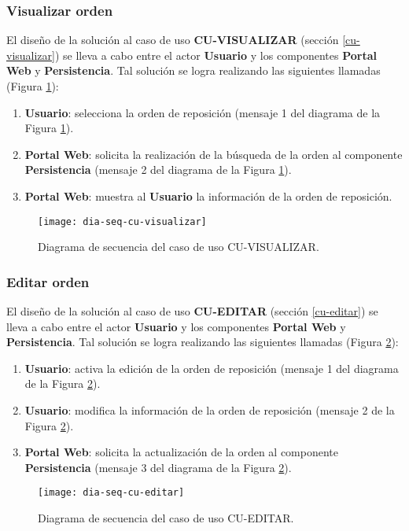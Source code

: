 \subsubsection{Visualizar orden}
El diseño de la solución al caso de uso \textbf{CU-VISUALIZAR} (sección \ref{cu-visualizar}) se lleva a cabo entre el actor \textbf{Usuario} y los componentes \textbf{Portal Web} y \textbf{Persistencia}. Tal solución se logra realizando las siguientes llamadas (Figura \ref{fig:dia-seq-cu-visualizar}):
\begin{enumerate}
	\item \textbf{Usuario}: selecciona la orden de reposición (mensaje 1 del diagrama de la Figura \ref{fig:dia-seq-cu-visualizar}).
	\item \textbf{Portal Web}: solicita la realización de la búsqueda de la orden al componente \textbf{Persistencia} (mensaje 2 del diagrama de la Figura \ref{fig:dia-seq-cu-visualizar}).
	\item \textbf{Portal Web}: muestra al \textbf{Usuario} la información de la orden de reposición.
\end{enumerate}
\begin{figure}[h]
	\centering
	\texttt{[image: dia-seq-cu-visualizar]}
	\caption{Diagrama de secuencia del caso de uso CU-VISUALIZAR.}
	\label{fig:dia-seq-cu-visualizar}
\end{figure}
\subsubsection{Editar orden}
El diseño de la solución al caso de uso \textbf{CU-EDITAR} (sección \ref{cu-editar}) se lleva a cabo entre el actor \textbf{Usuario} y los componentes \textbf{Portal Web} y \textbf{Persistencia}. Tal solución se logra realizando las siguientes llamadas (Figura \ref{fig:dia-seq-cu-editar}):
\begin{enumerate}
	\item \textbf{Usuario}: activa la edición de la orden de reposición (mensaje 1 del diagrama de la Figura \ref{fig:dia-seq-cu-editar}).
	\item \textbf{Usuario}: modifica la información de la orden de reposición (mensaje 2 de la Figura \ref{fig:dia-seq-cu-editar}).
	\item \textbf{Portal Web}: solicita la actualización de la orden al componente \textbf{Persistencia} (mensaje 3 del diagrama de la Figura \ref{fig:dia-seq-cu-editar}).
\end{enumerate}
\begin{figure}[h]
	\centering
	\texttt{[image: dia-seq-cu-editar]}
	\caption{Diagrama de secuencia del caso de uso CU-EDITAR.}
	\label{fig:dia-seq-cu-editar}
\end{figure}
